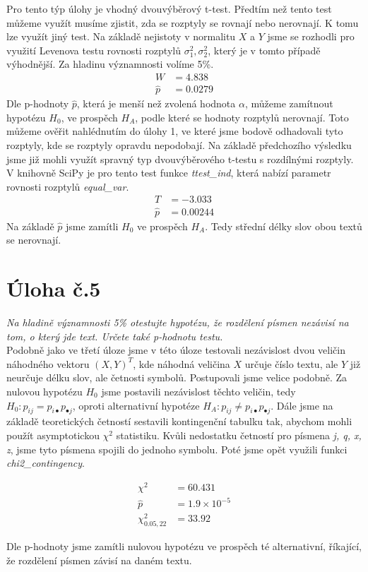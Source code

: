 \documentclass[czech]{mvi-report}
\begin{document}
Pro tento týp úlohy je vhodný dvouvýběrový t-test. Předtím než tento test můžeme využít musíme zjistit, zda se rozptyly se rovnají nebo nerovnají. K tomu lze využít jiný test. Na základě nejistoty v normalitu $ X $ a $ Y $ jsme se rozhodli pro využití Levenova testu rovnosti rozptylů $ \sigma^2_1, \sigma^2_2 $, který je v tomto případě výhodnější. Za hladinu významnosti volíme 5\%.
\begin{align*}
W &= 4.838\\
\hat{p} &= 0.0279
\end{align*}
Dle p-hodnoty $ \hat{p} $, která je menší než zvolená hodnota $ \alpha $, můžeme zamítnout hypotézu $ H_0 $, ve prospěch $ H_A $, podle které se hodnoty rozptylů nerovnají. Toto můžeme ověřit nahlédnutím do úlohy 1, ve které jsme bodově odhadovali tyto rozptyly, kde se rozptyly opravdu nepodobají.
Na základě předchozího výsledku jsme již mohli využít spravný typ dvouvýběrového t-testu s rozdílnými rozptyly. V knihovně SciPy je pro tento test funkce \textit{ttest\_ind}, která nabízí parametr rovnosti rozptylů \textit{equal\_var}.
\begin{align*}
T &= -3.033\\
\hat{p} &= 0.00244
\end{align*}
Na základě $ \hat{p} $ jsme zamítli $ H_0 $ ve prospěch $ H_A $. Tedy střední délky slov obou textů se nerovnají.

\section{Úloha č.5}
\textit{Na hladině významnosti 5\% otestujte hypotézu, že rozdělení písmen nezávisí na tom, o který jde text. Určete také p-hodnotu testu.}\\

Podobně jako ve třetí úloze jsme v této úloze testovali nezávislost dvou veličin náhodného vektoru $ (X,Y)^T $, kde náhodná veličina $ X $ určuje číslo textu, ale $ Y $ již neurčuje délku slov, ale četnosti symbolů. Postupovali jsme velice podobně. Za nulovou hypotézu $ H_0 $ jsme postavili nezávislost těchto veličin, tedy $ H_0: p_{ij}=p_{i \bullet} p_{\bullet j} $, oproti alternativní hypotéze $ H_A: p_{ij}\neq p_{i \bullet} p_{\bullet j} $. Dále jsme na základě teoretických četností sestavili kontingenční tabulku tak, abychom mohli použít asymptotickou $ \chi^2 $ statistiku. Kvůli nedostatku četností pro písmena \textit{j, q, x, z}, jsme tyto písmena spojili do jednoho symbolu. Poté jsme opět využili funkci \textit{chi2\_contingency}.

\begin{align*}
\chi^2 &= 60.431\\
\hat{p} &= 1.9\times 10^{-5}\\
\chi^2_{0.05,22} &= 33.92
\end{align*}

Dle p-hodnoty jsme zamítli nulovou hypotézu ve prospěch té alternativní, říkající, že rozdělení písmen závisí na daném textu.
\end{document}
